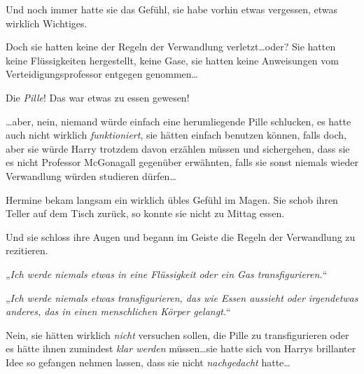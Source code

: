 Und noch immer hatte sie das Gefühl, sie habe vorhin etwas vergessen, etwas wirklich Wichtiges.

Doch sie hatten keine der Regeln der Verwandlung verletzt…oder? Sie hatten keine Flüssigkeiten hergestellt, keine Gase, sie hatten keine Anweisungen vom Verteidigungsprofessor entgegen genommen…

Die \emph{Pille}! Das war etwas zu essen gewesen!

…aber, nein, niemand würde einfach eine herumliegende Pille schlucken, es hatte auch nicht wirklich \emph{funktioniert}, sie hätten einfach  benutzen können, falls doch, aber sie würde Harry trotzdem davon erzählen müssen und sichergehen, dass sie es nicht Professor McGonagall gegenüber erwähnten, falls sie sonst niemals wieder Verwandlung würden studieren dürfen…

Hermine bekam langsam ein wirklich übles Gefühl im Magen. Sie schob ihren Teller auf dem Tisch zurück, so konnte sie nicht zu Mittag essen.

Und sie schloss ihre Augen und begann im Geiste die Regeln der Verwandlung zu rezitieren.

„\emph{Ich werde niemals etwas in eine Flüssigkeit oder ein Gas transfigurieren.}“

„\emph{Ich werde niemals etwas transfigurieren, das wie Essen aussieht oder irgendetwas anderes, das in einen menschlichen Körper gelangt.}“

Nein, sie hätten wirklich \emph{nicht} versuchen sollen, die Pille zu transfigurieren oder es hätte ihnen zumindest \emph{klar werden} müssen…sie hatte sich von Harrys brillanter Idee so gefangen nehmen lassen, dass sie nicht \emph{nachgedacht} hatte…

